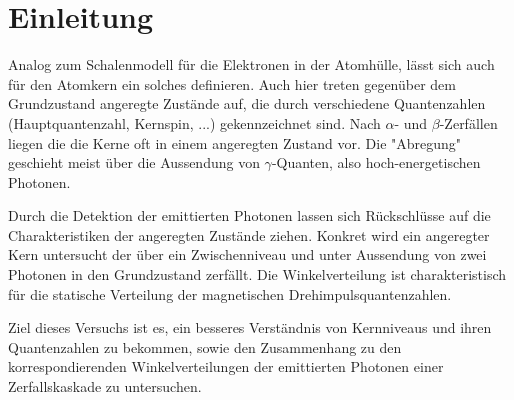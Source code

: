 \section{Einleitung}

Analog zum Schalenmodell für die Elektronen in der Atomhülle, lässt sich auch für den Atomkern ein solches definieren.
Auch hier treten gegenüber dem Grundzustand angeregte Zustände auf, die durch verschiedene Quantenzahlen (Hauptquantenzahl, Kernspin, ...) gekennzeichnet sind. Nach $\alpha$- und $\beta$-Zerfällen liegen die die Kerne oft in einem angeregten Zustand vor.
Die "Abregung" geschieht meist über die Aussendung von $\gamma$-Quanten, also hoch-energetischen Photonen.

Durch die Detektion der emittierten Photonen lassen sich Rückschlüsse auf die Charakteristiken der angeregten Zustände ziehen. Konkret wird ein angeregter Kern untersucht der über ein Zwischenniveau und unter Aussendung von zwei Photonen in den Grundzustand zerfällt. Die Winkelverteilung ist charakteristisch für die statische Verteilung der magnetischen Drehimpulsquantenzahlen.

Ziel dieses Versuchs ist es, ein besseres Verständnis von Kernniveaus und ihren Quantenzahlen zu bekommen, sowie den Zusammenhang zu den korrespondierenden Winkelverteilungen der emittierten Photonen einer Zerfallskaskade zu untersuchen.


